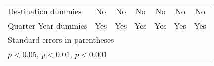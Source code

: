 \begin{table}[htbp]
\begin{tabular}{l*{6}{c}}
Destination dummies &          No         &          No         &          No         &          No         &          No         &          No         \\
Quarter-Year dummies&         Yes         &         Yes         &         Yes         &         Yes         &         Yes         &         Yes         \\
\hline\hline
\multicolumn{7}{l}{\footnotesize Standard errors in parentheses}\\
\multicolumn{7}{l}{\footnotesize \sym{*} \(p<0.05\), \sym{**} \(p<0.01\), \sym{***} \(p<0.001\)}\\
\end{tabular}
\end{table}
